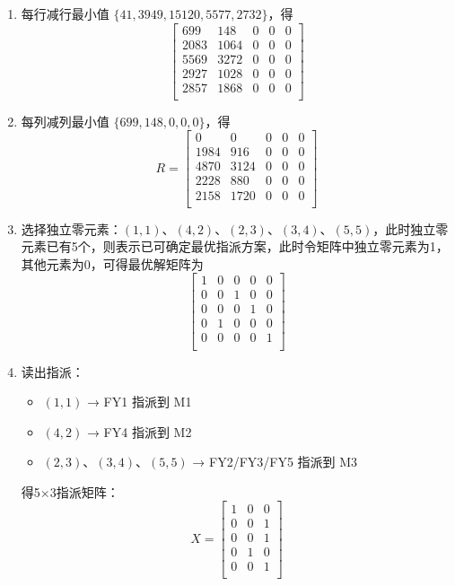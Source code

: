 \documentclass[withoutpreface]{cumcmthesis}
\begin{document}
\begin{enumerate}
\item[1)] 每行减行最小值 \(\{41, 3949, 15120, 5577, 2732\}\)，得
\[
\begin{bmatrix}
699 & 148 & 0 & 0 & 0 \\
2083 & 1064 & 0 & 0 & 0 \\
5569 & 3272 & 0 & 0 & 0 \\
2927 & 1028 & 0 & 0 & 0 \\
2857 & 1868 & 0 & 0 & 0 \\
\end{bmatrix}
\]

\item[2)] 每列减列最小值 \(\{699, 148, 0, 0, 0\}\)，得
\[
R = \begin{bmatrix}
0 & 0 & 0 & 0 & 0 \\
1984 & 916 & 0 & 0 & 0 \\
4870 & 3124 & 0 & 0 & 0 \\
2228 & 880 & 0 & 0 & 0 \\
2158 & 1720 & 0 & 0 & 0 \\
\end{bmatrix}
\]

\item[3)] 选择独立零元素：\((1,1)\)、\((4,2)\)、\((2,3)\)、\((3,4)\)、\((5,5)\)，此时独立零元素已有5个，则表示已可确定最优指派方案，此时令矩阵中独立零元素为1，其他元素为0，可得最优解矩阵为
\[
\begin{bmatrix}
1 & 0 & 0 & 0 & 0 \\
0 & 0 & 1 & 0 & 0 \\
0 & 0 & 0 & 1 & 0 \\
0 & 1 & 0 & 0 & 0 \\
0 & 0 & 0 & 0 & 1 \\
\end{bmatrix}
\]
\item[4)] 读出指派：
\begin{itemize}
\item \((1,1)\) → FY1 指派到 M1
\item \((4,2)\) → FY4 指派到 M2
\item \((2,3)\)、\((3,4)\)、\((5,5)\) → FY2/FY3/FY5 指派到 M3
\end{itemize}
得5×3指派矩阵：
\[
X = \begin{bmatrix}
1 & 0 & 0 \\
0 & 0 & 1 \\
0 & 0 & 1 \\
0 & 1 & 0 \\
0 & 0 & 1 \\
\end{bmatrix}
\]
\end{enumerate}
\end{document}
